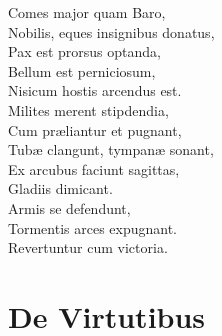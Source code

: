 \documentclass[12pt, twocolumn]{memoir}
\begin{document}
Comes major quam Baro,\\
Nobilis, eques insignibus donatus,\\
Pax est prorsus optanda,\\
Bellum est perniciosum,\\
Nisicum hostis arcendus est.\\
Milites merent stipdendia,\\
Cum præliantur et pugnant,\\
Tubæ clangunt, tympanæ sonant,\\
Ex arcubus faciunt sagittas,\\
Gladiis dimicant.\\
Armis se defendunt,\\
Tormentis arces expugnant.\\
Revertuntur cum victoria.\\

\chapter{De Virtutibus}
\end{document}
